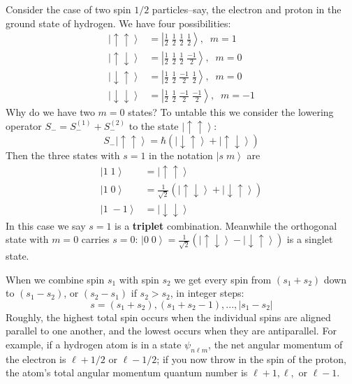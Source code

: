 \documentclass[12pt, a4paper, oneside, openright, titlepage]{book}
\newcommand{\ket}[1]{\left\vert#1\right\rangle}
\begin{document}
\begin{eg}
    Consider the case of two spin $1/2$ particles\---say, the electron and proton in the ground state of hydrogen. We have four possibilities: \begin{align*}
        \ket{\uparrow\uparrow} &= \ket{\frac{1}{2}\;\frac{1}{2}\;\frac{1}{2}\;\frac{1}{2}},\;\;m=1 \\
        \ket{\uparrow\downarrow} &= \ket{\frac{1}{2}\;\frac{1}{2}\;\frac{1}{2}\;\frac{-1}{2}},\;\;m=0 \\
        \ket{\downarrow\uparrow} &= \ket{\frac{1}{2}\;\frac{1}{2}\;\frac{-1}{2}\;\frac{1}{2}},\;\;m=0 \\
        \ket{\downarrow\downarrow} &= \ket{\frac{1}{2}\;\frac{1}{2}\;\frac{-1}{2}\;\frac{-1}{2}},\;\;m=-1 
    \end{align*}
    Why do we have two $m = 0$ states? To untable this we consider the lowering operator $S_- = S_-^{(1)} + S_-^{(2)}$ to the state $\ket{\uparrow\uparrow}$: \begin{equation*}
        S_-\ket{\uparrow\uparrow} = \hbar(\ket{\downarrow\uparrow}+\ket{\uparrow\downarrow})
    \end{equation*}
    Then the three states with $s = 1$ in the notation $\ket{s\;m}$ are \begin{align*}
        \ket{1\;1} &= \ket{\uparrow\uparrow} \\
        \ket{1\;0} &= \frac{1}{\sqrt{2}}(\ket{\uparrow\downarrow}+\ket{\downarrow\uparrow}) \\
        \ket{1\;-1} &= \ket{\downarrow\downarrow}
    \end{align*}
    In this case we say $s = 1$ is a \textbf{triplet} combination. Meanwhile the orthogonal state with $m = 0$ carries $s = 0$: $\ket{0\;0} = \frac{1}{\sqrt{2}}(\ket{\uparrow\downarrow}-\ket{\downarrow\uparrow})$ is a singlet state. 
\end{eg}

When we combine spin $s_1$ with spin $s_2$ we get every spin from $(s_1+s_2)$ down to $(s_1-s_2)$, or $(s_2-s_1)$ if $s_2 > s_2$, in integer steps: \begin{equation*}
    s = (s_1+s_2), (s_1+s_2-1),...,|s_1-s_2|
\end{equation*}
Roughly, the highest total spin occurs when the individual spins are aligned parallel to one another, and the lowest occurs when they are antiparallel. For example, if a hydrogen atom is in a state $\psi_{n\ell m}$, the net angular momentum of the electron is $\ell+1/2$ or $\ell-1/2$; if you now throw in the spin of the proton, the atom's total angular momentum quantum number is $\ell+1,\ell,$ or $\ell-1$.
\end{document}
